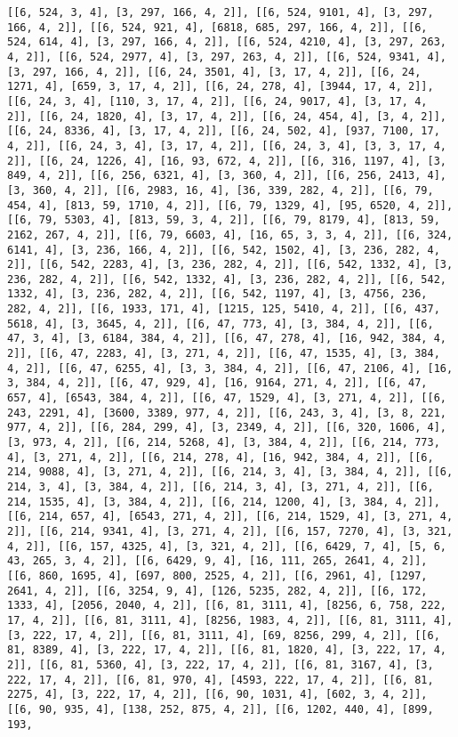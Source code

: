 \documentclass[12pt,fleqn]{article}\usepackage{../../common}
\begin{document}
\begin{verbatim}
[[6, 524, 3, 4], [3, 297, 166, 4, 2]], [[6, 524, 9101, 4], [3, 297, 166, 4, 2]], [[6, 524, 921, 4], [6818, 685, 297, 166, 4, 2]], [[6, 524, 614, 4], [3, 297, 166, 4, 2]], [[6, 524, 4210, 4], [3, 297, 263, 4, 2]], [[6, 524, 2977, 4], [3, 297, 263, 4, 2]], [[6, 524, 9341, 4], [3, 297, 166, 4, 2]], [[6, 24, 3501, 4], [3, 17, 4, 2]], [[6, 24, 1271, 4], [659, 3, 17, 4, 2]], [[6, 24, 278, 4], [3944, 17, 4, 2]], [[6, 24, 3, 4], [110, 3, 17, 4, 2]], [[6, 24, 9017, 4], [3, 17, 4, 2]], [[6, 24, 1820, 4], [3, 17, 4, 2]], [[6, 24, 454, 4], [3, 4, 2]], [[6, 24, 8336, 4], [3, 17, 4, 2]], [[6, 24, 502, 4], [937, 7100, 17, 4, 2]], [[6, 24, 3, 4], [3, 17, 4, 2]], [[6, 24, 3, 4], [3, 3, 17, 4, 2]], [[6, 24, 1226, 4], [16, 93, 672, 4, 2]], [[6, 316, 1197, 4], [3, 849, 4, 2]], [[6, 256, 6321, 4], [3, 360, 4, 2]], [[6, 256, 2413, 4], [3, 360, 4, 2]], [[6, 2983, 16, 4], [36, 339, 282, 4, 2]], [[6, 79, 454, 4], [813, 59, 1710, 4, 2]], [[6, 79, 1329, 4], [95, 6520, 4, 2]], [[6, 79, 5303, 4], [813, 59, 3, 4, 2]], [[6, 79, 8179, 4], [813, 59, 2162, 267, 4, 2]], [[6, 79, 6603, 4], [16, 65, 3, 3, 4, 2]], [[6, 324, 6141, 4], [3, 236, 166, 4, 2]], [[6, 542, 1502, 4], [3, 236, 282, 4, 2]], [[6, 542, 2283, 4], [3, 236, 282, 4, 2]], [[6, 542, 1332, 4], [3, 236, 282, 4, 2]], [[6, 542, 1332, 4], [3, 236, 282, 4, 2]], [[6, 542, 1332, 4], [3, 236, 282, 4, 2]], [[6, 542, 1197, 4], [3, 4756, 236, 282, 4, 2]], [[6, 1933, 171, 4], [1215, 125, 5410, 4, 2]], [[6, 437, 5618, 4], [3, 3645, 4, 2]], [[6, 47, 773, 4], [3, 384, 4, 2]], [[6, 47, 3, 4], [3, 6184, 384, 4, 2]], [[6, 47, 278, 4], [16, 942, 384, 4, 2]], [[6, 47, 2283, 4], [3, 271, 4, 2]], [[6, 47, 1535, 4], [3, 384, 4, 2]], [[6, 47, 6255, 4], [3, 3, 384, 4, 2]], [[6, 47, 2106, 4], [16, 3, 384, 4, 2]], [[6, 47, 929, 4], [16, 9164, 271, 4, 2]], [[6, 47, 657, 4], [6543, 384, 4, 2]], [[6, 47, 1529, 4], [3, 271, 4, 2]], [[6, 243, 2291, 4], [3600, 3389, 977, 4, 2]], [[6, 243, 3, 4], [3, 8, 221, 977, 4, 2]], [[6, 284, 299, 4], [3, 2349, 4, 2]], [[6, 320, 1606, 4], [3, 973, 4, 2]], [[6, 214, 5268, 4], [3, 384, 4, 2]], [[6, 214, 773, 4], [3, 271, 4, 2]], [[6, 214, 278, 4], [16, 942, 384, 4, 2]], [[6, 214, 9088, 4], [3, 271, 4, 2]], [[6, 214, 3, 4], [3, 384, 4, 2]], [[6, 214, 3, 4], [3, 384, 4, 2]], [[6, 214, 3, 4], [3, 271, 4, 2]], [[6, 214, 1535, 4], [3, 384, 4, 2]], [[6, 214, 1200, 4], [3, 384, 4, 2]], [[6, 214, 657, 4], [6543, 271, 4, 2]], [[6, 214, 1529, 4], [3, 271, 4, 2]], [[6, 214, 9341, 4], [3, 271, 4, 2]], [[6, 157, 7270, 4], [3, 321, 4, 2]], [[6, 157, 4325, 4], [3, 321, 4, 2]], [[6, 6429, 7, 4], [5, 6, 43, 265, 3, 4, 2]], [[6, 6429, 9, 4], [16, 111, 265, 2641, 4, 2]], [[6, 860, 1695, 4], [697, 800, 2525, 4, 2]], [[6, 2961, 4], [1297, 2641, 4, 2]], [[6, 3254, 9, 4], [126, 5235, 282, 4, 2]], [[6, 172, 1333, 4], [2056, 2040, 4, 2]], [[6, 81, 3111, 4], [8256, 6, 758, 222, 17, 4, 2]], [[6, 81, 3111, 4], [8256, 1983, 4, 2]], [[6, 81, 3111, 4], [3, 222, 17, 4, 2]], [[6, 81, 3111, 4], [69, 8256, 299, 4, 2]], [[6, 81, 8389, 4], [3, 222, 17, 4, 2]], [[6, 81, 1820, 4], [3, 222, 17, 4, 2]], [[6, 81, 5360, 4], [3, 222, 17, 4, 2]], [[6, 81, 3167, 4], [3, 222, 17, 4, 2]], [[6, 81, 970, 4], [4593, 222, 17, 4, 2]], [[6, 81, 2275, 4], [3, 222, 17, 4, 2]], [[6, 90, 1031, 4], [602, 3, 4, 2]], [[6, 90, 935, 4], [138, 252, 875, 4, 2]], [[6, 1202, 440, 4], [899, 193, 
\end{verbatim}
\end{document}
